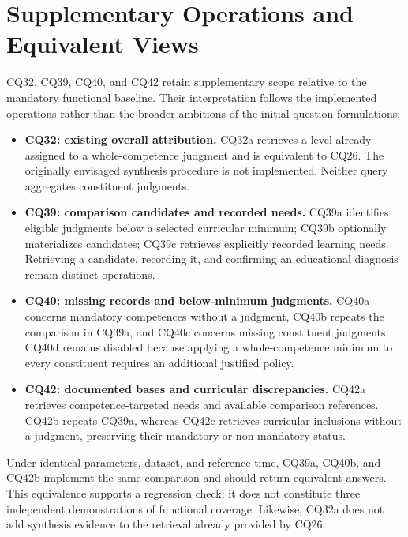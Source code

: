 \section{Supplementary Operations and Equivalent Views}

CQ32, CQ39, CQ40, and CQ42 retain supplementary scope relative to the
mandatory functional baseline. Their interpretation follows the
implemented operations rather than the broader ambitions of the initial
question formulations:

\begin{itemize}
    \item \textbf{CQ32: existing overall attribution.}
    CQ32a retrieves a level already assigned to a whole-competence
    judgment and is equivalent to CQ26. The originally envisaged
    synthesis procedure is not implemented. Neither query aggregates
    constituent judgments.

    \item \textbf{CQ39: comparison candidates and recorded needs.}
    CQ39a identifies eligible judgments below a selected curricular
    minimum; CQ39b optionally materializes candidates; CQ39c retrieves
    explicitly recorded learning needs. Retrieving a candidate,
    recording it, and confirming an educational diagnosis remain
    distinct operations.

    \item \textbf{CQ40: missing records and below-minimum judgments.}
    CQ40a concerns mandatory competences without a judgment, CQ40b
    repeats the comparison in CQ39a, and CQ40c concerns missing
    constituent judgments. CQ40d remains disabled because applying a
    whole-competence minimum to every constituent requires an additional
    justified policy.

    \item \textbf{CQ42: documented bases and curricular discrepancies.}
    CQ42a retrieves competence-targeted needs and available comparison
    references. CQ42b repeats CQ39a, whereas CQ42c retrieves curricular
    inclusions without a judgment, preserving their mandatory or
    non-mandatory status.
\end{itemize}

Under identical parameters, dataset, and reference time, CQ39a, CQ40b,
and CQ42b implement the same comparison and should return equivalent
answers. This equivalence supports a regression check; it does not
constitute three independent demonstrations of functional coverage.
Likewise, CQ32a does not add synthesis evidence to the retrieval already
provided by CQ26.

